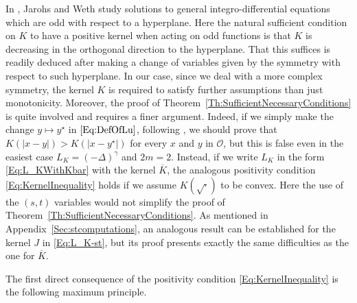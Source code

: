 \documentclass[12pt,reqno]{amsart}
\theoremstyle{definition}
\theoremstyle{remark}
\newcommand{\ocal}{\mathcal{O}}
\newcommand{\s}{\gamma}
\newcommand{\fraclaplacian}{(-\Delta)^\s}
\numberwithin{equation}{section}
\begin{document}
In \cite{JarohsWeth}, Jarohs and Weth study solutions to general integro-differential equations which are odd with respect to a hyperplane. Here the natural sufficient condition on $K$ to have a positive kernel when acting on odd functions is that $K$ is decreasing in the orthogonal direction to the hyperplane. That this suffices is readily deduced after making a change of variables given by the symmetry with respect to such hyperplane. In our case, since we deal with a more complex symmetry, the kernel $K$ is required to satisfy further assumptions than just monotonicity. Moreover, the proof of Theorem~\ref{Th:SufficientNecessaryConditions} is quite involved and requires a finer argument. Indeed, if we simply make the change $y \mapsto y^\star$ in $\eqref{Eq:DefOfLu}$, following \cite{JarohsWeth}, we should prove that $K(|x-y|) > K(|x-y^\star|)$ for every $x$ and $y$ in $\ocal$, but this is false even in the easiest case $L_K = \fraclaplacian$ and $2m=2$. Instead, if we write $L_K$ in the form \eqref{Eq:L_KWithKbar} with the kernel $\overline{K}$, the analogous positivity condition \eqref{Eq:KernelInequality} holds if we assume $K(\sqrt{\cdot})$ to be convex. Here the use of the $(s,t)$ variables would not simplify the proof of Theorem~\ref{Th:SufficientNecessaryConditions}. As mentioned in Appendix~\ref{Sec:stcomputations}, an analogous result can be established for the kernel $J$ in \eqref{Eq:L_K-st}, but its proof presents exactly the same difficulties as the one for $\overline{K}$.


The first direct consequence of the positivity condition \eqref{Eq:KernelInequality} is the following maximum principle.
\end{document}
